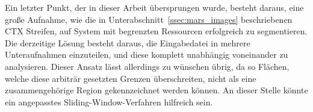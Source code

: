 Ein letzter Punkt, der in dieser Arbeit übersprungen wurde, besteht daraus, eine große Aufnahme, wie die in Unterabschnitt~\ref{ssec:mars_images} beschriebenen CTX Streifen, auf System mit begrenzten Ressourcen erfolgreich zu segmentieren. Die derzeitige Lösung besteht daraus, die Eingabedatei in mehrere Unteraufnahmen einzuteilen, und diese komplett unabhängig voneinander zu analysieren. Dieser Ansatz lässt allerdings zu wünschen übrig, da so Flächen, welche diese arbiträr gesetzten Grenzen überschreiten, nicht als eine zusammengehörige Region gekennzeichnet werden können. An dieser Stelle könnte ein angepasstes Sliding-Window-Verfahren hilfreich sein.